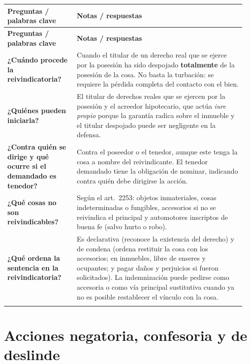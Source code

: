 \documentclass[12pt,oneside]{book}
\makeatletter
\newenvironment{cornell}{%
    \par\vspace{0.5em}
    \begin{longtable}{@{}>{\RaggedRight\arraybackslash}p{0.28\linewidth}
                         >{\RaggedRight\arraybackslash}p{0.68\linewidth}@{}}
    \toprule
    \textbf{Preguntas / palabras clave} & \textbf{Notas / respuestas} \\
    \midrule
    \endfirsthead
    \toprule
    \textbf{Preguntas / palabras clave} & \textbf{Notas / respuestas} \\
    \midrule
    \endhead
}{%
    \bottomrule
    \end{longtable}
}
\newcommand{\cornellsummary}[1]{%
    \midrule
    \multicolumn{2}{@{}p{\dimexpr0.96\linewidth+2\tabcolsep\relax}@{}}{%
        \textbf{Resumen:} #1} \\
}
\makeatother
\begin{document}
\begin{cornell}
\textbf{¿Cuándo procede la reivindicatoria?} &
Cuando el titular de un derecho real que se ejerce por la posesión ha sido despojado \textbf{totalmente} de la posesión de la cosa. No basta la turbación: se requiere la pérdida completa del contacto con el bien. \\[0.6em]

\textbf{¿Quiénes pueden iniciarla?} &
El titular de derechos reales que se ejercen por la posesión y el acreedor hipotecario, que actúa \textit{iure propio} porque la garantía radica sobre el inmueble y el titular despojado puede ser negligente en la defensa. \\[0.6em]

\textbf{¿Contra quién se dirige y qué ocurre si el demandado es tenedor?} &
Contra el poseedor o el tenedor, aunque este tenga la cosa a nombre del reivindicante. El tenedor demandado tiene la obligación de nominar, indicando contra quién debe dirigirse la acción. \\[0.6em]

\textbf{¿Qué cosas no son reivindicables?} &
Según el art.\ 2253: objetos inmateriales, cosas indeterminadas o fungibles, accesorios si no se reivindica el principal y automotores inscriptos de buena fe (salvo hurto o robo). \\[0.6em]

\textbf{¿Qué ordena la sentencia en la reivindicatoria?} &
Es declarativa (reconoce la existencia del derecho) y de condena (ordena restituir la cosa con los accesorios; en inmuebles, libre de enseres y ocupantes; y pagar daños y perjuicios si fueron solicitados). La indemnización puede pedirse como accesoria o como vía principal sustitutiva cuando ya no es posible restablecer el vínculo con la cosa. \\

\cornellsummary{La reivindicatoria protege la existencia del derecho ante el despojo total de la posesión. Pueden iniciarla el titular y, \textit{iure propio}, el acreedor hipotecario; se dirige contra el poseedor o el tenedor. La sentencia es declarativa y de condena, y ordena restituir la cosa con sus accesorios, y en su caso indemnizar.}
\end{cornell}

\chapter[Acciones negatoria, confesoria y de deslinde]{Acciones negatoria, confesoria y de deslinde}
\end{document}
